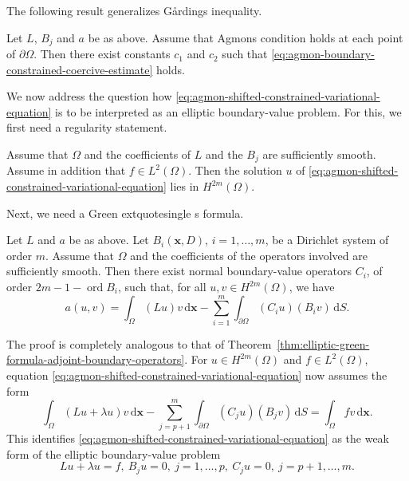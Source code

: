 The following result generalizes Gårding\textquotesingle s inequality.

\begin{Theorem}
\label{thm:agmon-boundary-constrained-coercivity}
Let $L$, $B_j$ and $a$ be as above. Assume that Agmon\textquotesingle s condition holds at each point of $\partial\Omega$. Then there exist constants $c_1$ and $c_2$ such that \eqref{eq:agmon-boundary-constrained-coercive-estimate} holds.
\end{Theorem}

We now address the question how \eqref{eq:agmon-shifted-constrained-variational-equation} is to be interpreted as an elliptic boundary-value problem. For this, we first need a regularity statement.

\begin{Theorem}
\label{thm:agmon-weak-variational-solution-regularity}
Assume that $\Omega$ and the coefficients of $L$ and the $B_j$ are sufficiently smooth. Assume in addition that $f\in L^2(\Omega)$. Then the solution $u$ of \eqref{eq:agmon-shifted-constrained-variational-equation} lies in $H^{2m}(\Omega)$.
\end{Theorem}

Next, we need a Green	extquotesingle s formula.

\begin{Theorem}
\label{thm:agmon-constrained-form-green-boundary-identity}
Let $L$ and $a$ be as above. Let $B_i(\bm{x},D)$, $i=1,\ldots,m$, be a Dirichlet system of order $m$. Assume that $\Omega$ and the coefficients of the operators involved are sufficiently smooth. Then there exist normal boundary-value operators $C_i$, of order $2m-1-\operatorname{ord}B_i$, such that, for all $u,v\in H^{2m}(\Omega)$, we have
\begin{equation}\label{eq:agmon-constrained-form-green-boundary-identity}
a(u,v)=\int_\Omega(Lu)v\,\mathrm{d}\bm{x}-\sum_{i=1}^m\int_{\partial\Omega}(C_iu)(B_iv)\,\mathrm{d}S.
\end{equation}

\end{Theorem}

The proof is completely analogous to that of Theorem~\ref{thm:elliptic-green-formula-adjoint-boundary-operators}. For $u\in H^{2m}(\Omega)$ and $f\in L^2(\Omega)$, equation \eqref{eq:agmon-shifted-constrained-variational-equation} now assumes the form
\begin{equation}\label{eq:agmon-shifted-form-natural-boundary-reduction}
\int_\Omega(Lu+\lambda u)v\,\mathrm{d}\bm{x}-\sum_{j=p+1}^m\int_{\partial\Omega}(C_ju)(B_jv)\,\mathrm{d}S=\int_\Omega fv\,\mathrm{d}\bm{x}.
\end{equation}
This identifies \eqref{eq:agmon-shifted-constrained-variational-equation} as the weak form of the elliptic boundary-value problem
\begin{equation}\label{eq:agmon-essential-natural-boundary-value-problem}
Lu+\lambda u=f,\ B_ju=0,\ j=1,\ldots,p,\ C_ju=0,\ j=p+1,\ldots,m.
\end{equation}


